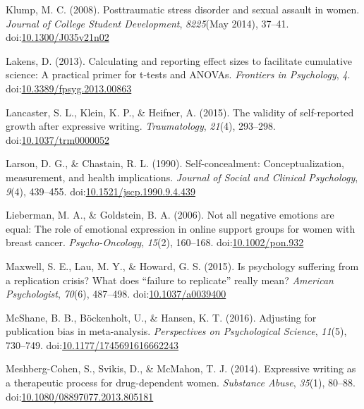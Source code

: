 \documentclass[english,man]{apa6}
\theoremstyle{definition}
\theoremstyle{definition}
\theoremstyle{definition}
\theoremstyle{remark}
\begin{document}
\hypertarget{ref-Klump2008}{}
Klump, M. C. (2008). Posttraumatic stress disorder and sexual assault in
women. \emph{Journal of College Student Development}, \emph{8225}(May
2014), 37--41.
doi:\href{https://doi.org/10.1300/J035v21n02}{10.1300/J035v21n02}

\hypertarget{ref-Lakens2013}{}
Lakens, D. (2013). Calculating and reporting effect sizes to facilitate
cumulative science: A practical primer for t-tests and ANOVAs.
\emph{Frontiers in Psychology}, \emph{4}.
doi:\href{https://doi.org/10.3389/fpsyg.2013.00863}{10.3389/fpsyg.2013.00863}

\hypertarget{ref-Lancaster2015}{}
Lancaster, S. L., Klein, K. P., \& Heifner, A. (2015). The validity of
self-reported growth after expressive writing. \emph{Traumatology},
\emph{21}(4), 293--298.
doi:\href{https://doi.org/10.1037/trm0000052}{10.1037/trm0000052}

\hypertarget{ref-Larson1990a}{}
Larson, D. G., \& Chastain, R. L. (1990). Self-concealment:
Conceptualization, measurement, and health implications. \emph{Journal
of Social and Clinical Psychology}, \emph{9}(4), 439--455.
doi:\href{https://doi.org/10.1521/jscp.1990.9.4.439}{10.1521/jscp.1990.9.4.439}

\hypertarget{ref-Lieberman2006}{}
Lieberman, M. A., \& Goldstein, B. A. (2006). Not all negative emotions
are equal: The role of emotional expression in online support groups for
women with breast cancer. \emph{Psycho-Oncology}, \emph{15}(2),
160--168. doi:\href{https://doi.org/10.1002/pon.932}{10.1002/pon.932}

\hypertarget{ref-Maxwell2015}{}
Maxwell, S. E., Lau, M. Y., \& Howard, G. S. (2015). Is psychology
suffering from a replication crisis? What does ``failure to replicate''
really mean? \emph{American Psychologist}, \emph{70}(6), 487--498.
doi:\href{https://doi.org/10.1037/a0039400}{10.1037/a0039400}

\hypertarget{ref-McShane2016}{}
McShane, B. B., Böckenholt, U., \& Hansen, K. T. (2016). Adjusting for
publication bias in meta-analysis. \emph{Perspectives on Psychological
Science}, \emph{11}(5), 730--749.
doi:\href{https://doi.org/10.1177/1745691616662243}{10.1177/1745691616662243}

\hypertarget{ref-Meshberg-Cohen2014}{}
Meshberg-Cohen, S., Svikis, D., \& McMahon, T. J. (2014). Expressive
writing as a therapeutic process for drug-dependent women.
\emph{Substance Abuse}, \emph{35}(1), 80--88.
doi:\href{https://doi.org/10.1080/08897077.2013.805181}{10.1080/08897077.2013.805181}
\end{document}
